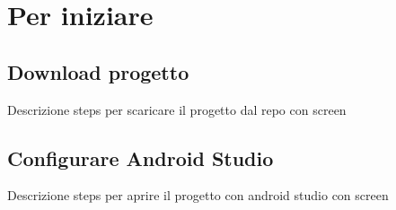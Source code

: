 \documentclass[../ManualeSviluppatore.tex]{subfiles}
\begin{document}
\section{Per iniziare}

	\subsection{Download progetto}
		Descrizione steps per scaricare il progetto dal repo con screen
	
	\subsection{Configurare Android Studio}
		Descrizione steps per aprire il progetto con android studio con screen
\end{document}
